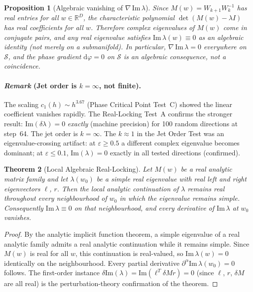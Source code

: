 \documentclass[11pt]{amsart}
\newtheorem{theorem}{Theorem}[section]
\newtheorem{proposition}[theorem]{Proposition}
\begin{document}
\begin{proposition}[Algebraic vanishing of $\nabla\,\mathrm{Im}\,\lambda$]
\label{prop:algebraic_vanishing}
Since $M(w) = W_{k+1}W_k^{-1}$ has real entries for all $w \in \mathbb{R}^D$,
the characteristic polynomial $\det(M(w) - \lambda I)$ has real
coefficients for all $w$.
Therefore complex eigenvalues of $M(w)$ come in conjugate pairs,
and any real eigenvalue satisfies $\mathrm{Im}\,\lambda(w) \equiv 0$
as an algebraic identity (not merely on a submanifold).
In particular, $\nabla\,\mathrm{Im}\,\lambda = 0$ everywhere on
$\mathcal{S}$, and the phase gradient $\mathrm{d}\varphi = 0$ on $\mathcal{S}$
is an algebraic consequence, not a coincidence.
\end{proposition}

\paragraph{\textit{Remark} (Jet order is $k=\infty$, not finite).}
The scaling $c_1(h) \sim h^{3.67}$ (Phase Critical Point Test~C)
showed the linear coefficient vanishes rapidly.
The Real-Locking Test~A confirms the stronger result:
$\mathrm{Im}(\delta\lambda) = 0$ \emph{exactly} (machine precision)
for 100 random directions at step~64.
The jet order is $k = \infty$.
The $k \approx 1$ in the Jet Order Test was an eigenvalue-crossing
artifact: at $\varepsilon \geq 0.5$ a different complex eigenvalue
becomes dominant; at $\varepsilon \leq 0.1$, $\mathrm{Im}(\lambda) = 0$
exactly in all tested directions (confirmed).

\begin{theorem}[Local Algebraic Real-Locking]
\label{thm:real_locking}
Let $M(w)$ be a real analytic matrix family and let $\lambda(w_0)$ be
a \emph{simple} real eigenvalue with real left and right eigenvectors
$\ell$, $r$.
Then the local analytic continuation of $\lambda$ remains real
throughout every neighbourhood of $w_0$ in which the eigenvalue
remains simple.
Consequently $\mathrm{Im}\,\lambda \equiv 0$ on that neighbourhood,
and every derivative of $\mathrm{Im}\,\lambda$ at $w_0$ vanishes.
\end{theorem}

\begin{proof}
By the analytic implicit function theorem, a simple eigenvalue of a
real analytic family admits a real analytic continuation while it
remains simple.
Since $M(w)$ is real for all $w$, this continuation is real-valued,
so $\mathrm{Im}\,\lambda(w) = 0$ identically on the neighbourhood.
Every partial derivative $\partial^\alpha\mathrm{Im}\,\lambda(w_0)=0$
follows.
The first-order instance $\delta\mathrm{Im}(\lambda) =
\mathrm{Im}(\ell^T\delta M r) = 0$ (since $\ell$, $r$, $\delta M$
are all real) is the perturbation-theory confirmation of the theorem.
\end{proof}
\end{document}
